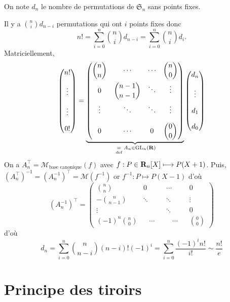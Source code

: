 \begin{ex}
    On note $d_n$ le nombre de permutations de $\mathfrak S_n$ sans points fixes.

    Il y a $\displaystyle \binom ni d_{n-i}$ permutations qui ont $i$ points fixes donc \[
        n!=\sum_{i=0}^n\binom nid_{n-i}=\sum_{i=0}^n\binom nid_i.
    \]
    Matriciellement, \[
        \begin{pmatrix}
            n!\\[1em]
            \vdots\\[1em]
            \vdots\\[1em]
            0!
            \end{pmatrix}= \underbrace{\begin{pmatrix}
        \displaystyle\binom nn & \cdots & \cdots & \displaystyle\binom n0 \\[1em]
        0 & \displaystyle\binom{n-1}{n-1} & \ddots & \vdots \\[1em]
        \vdots & \ddots & \ddots & \vdots \\[1em]
        0 & \cdots & 0 & \displaystyle\binom 00
    \end{pmatrix}}_{\;\underset{\text{def}}=\; A_n\in \mathrm{GL}_n(\mathbf R)} \begin{pmatrix}
        d_n\\[1em]
        \vdots \\[1em]
        d_1\\[1em]
        d_0
        \end{pmatrix}
    \]
    On a $A_n^\top=\mathcal {M}_{\text{base canonique}}(f)$ avec $f:P\in\mathbf R_n[X]\longmapsto P(X+1)$. Puis, $(A_n^\top)^{-1}=(A_n^{-1})^\top=\mathcal M(f^{-1})$ or $f^{-1}:P\longmapsto P(X-1)$ d'où \[
        (A_n^{-1})^\top = \begin{pmatrix}
            \displaystyle\binom nn & 0 & \cdots & 0 \\[1em]
            \displaystyle -\binom n{n-1} & \ddots & \ddots & \vdots \\[1em]
            \vdots &  & \ddots & 0 \\[1em]
            (-1)^n\displaystyle\binom n0 & \;\;\;\cdots\;\;\; & \;\;\;\cdots\;\;\; & \displaystyle\binom 00
        \end{pmatrix}
    \]
    d'où \[
        d_n=\sum_{i=0}^n\binom n{n-i}(n-i)!(-1)^i=\sum_{i=0}^n\frac{(-1)^in!}{i!}\sim \frac{n!}e
    \]
\end{ex}

\section{Principe des tiroirs}

